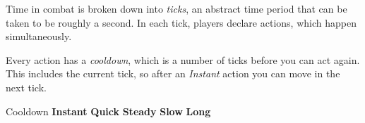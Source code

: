 
Time in combat is broken down into \emph{ticks}, an abstract time period that can be taken to be roughly a second. In each tick, players declare actions, which happen simultaneously.

Every action has a \emph{cooldown}, which is a number of ticks before you can act again. This includes the current tick, so after an \emph{Instant} action you can move in the next tick.

\begin{abstractsection}{Cooldown}
  \textbf{Instant}  \hfill
  \textbf{Quick}    \hfill
  \textbf{Steady}   \hfill
  \textbf{Slow}     \hfill
  \textbf{Long}     \hspace*{-5ex} %
\end{abstractsection}
